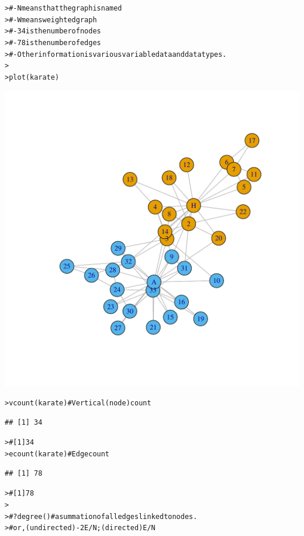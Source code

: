 \documentclass[12pt]{article}\usepackage[]{graphicx}\usepackage[]{color}
\makeatletter
\newcommand{\hlcom}[1]{\textcolor[rgb]{0.404,0.408,0.42}{#1}}%
\newcommand{\hlstd}[1]{\textcolor[rgb]{0.882,0.878,0.898}{#1}}%
\newcommand{\hlkwd}[1]{\textcolor[rgb]{0.733,0.388,0.812}{#1}}%
\newenvironment{kframe}{%
 \def\at@end@of@kframe{}%
 \ifinner\ifhmode%
  \def\at@end@of@kframe{\end{minipage}}%
  \begin{minipage}{\columnwidth}%
 \fi\fi%
 \def\FrameCommand##1{\hskip\@totalleftmargin \hskip-\fboxsep
 \colorbox{shadecolor}{##1}\hskip-\fboxsep
     \hskip-\linewidth \hskip-\@totalleftmargin \hskip\columnwidth}%
 \MakeFramed {\advance\hsize-\width
   \@totalleftmargin\z@ \linewidth\hsize
   \@setminipage}}%
 {\par\unskip\endMakeFramed%
 \at@end@of@kframe}
\newenvironment{knitrout}{}{} %
\makeatother
\begin{document}
\begin{flushleft}
\begin{center}
\begin{knitrout}
\begin{kframe}
\begin{alltt}
\hlstd{> }\hlcom{# - N means that the graph is named}
\hlstd{> }\hlcom{# - W means weighted graph}
\hlstd{> }\hlcom{# - 34 is the number of nodes}
\hlstd{> }\hlcom{# - 78 is the number of edges}
\hlstd{> }\hlcom{# - Other information is various variable data and data types.}
\hlstd{> }
\hlstd{> }\hlkwd{plot}\hlstd{(karate)}
\end{alltt}
\end{kframe}
\includegraphics[width=6in]{figure/Network_Basics-3} 
\begin{kframe}\begin{alltt}
\hlstd{> }\hlkwd{vcount}\hlstd{(karate)} \hlcom{# Vertical (node) count}
\end{alltt}
\begin{verbatim}
## [1] 34
\end{verbatim}
\begin{alltt}
\hlstd{> }\hlcom{# [1] 34}
\hlstd{> }\hlkwd{ecount}\hlstd{(karate)} \hlcom{# Edge count}
\end{alltt}
\begin{verbatim}
## [1] 78
\end{verbatim}
\begin{alltt}
\hlstd{> }\hlcom{# [1] 78}
\hlstd{> }
\hlstd{> }\hlcom{# ?degree() # a summation of all edges linked to nodes.}
\hlstd{> }\hlcom{# or, (undirected) - 2E/N;  (directed) E/N}

\end{alltt}
\end{kframe}
\end{knitrout}
\end{center}
\end{flushleft}
\end{document}
